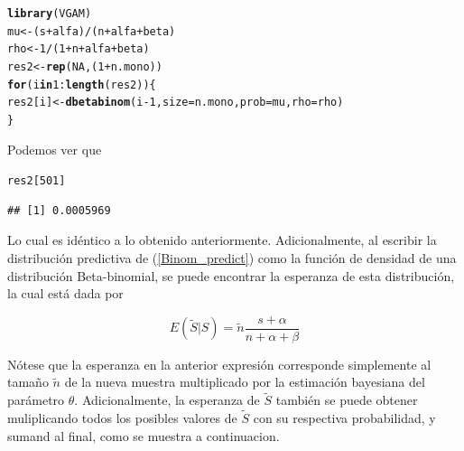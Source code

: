 \documentclass[10pt,openright]{book}\usepackage[]{graphicx}\usepackage[]{color}
\makeatletter
\newcommand{\hlnum}[1]{\textcolor[rgb]{0.686,0.059,0.569}{#1}}%
\newcommand{\hlopt}[1]{\textcolor[rgb]{0,0,0}{#1}}%
\newcommand{\hlstd}[1]{\textcolor[rgb]{0.345,0.345,0.345}{#1}}%
\newcommand{\hlkwa}[1]{\textcolor[rgb]{0.161,0.373,0.58}{\textbf{#1}}}%
\newcommand{\hlkwb}[1]{\textcolor[rgb]{0.69,0.353,0.396}{#1}}%
\newcommand{\hlkwc}[1]{\textcolor[rgb]{0.333,0.667,0.333}{#1}}%
\newcommand{\hlkwd}[1]{\textcolor[rgb]{0.737,0.353,0.396}{\textbf{#1}}}%
\newenvironment{kframe}{%
 \def\at@end@of@kframe{}%
 \ifinner\ifhmode%
  \def\at@end@of@kframe{\end{minipage}}%
  \begin{minipage}{\columnwidth}%
 \fi\fi%
 \def\FrameCommand##1{\hskip\@totalleftmargin \hskip-\fboxsep
 \colorbox{shadecolor}{##1}\hskip-\fboxsep
     \hskip-\linewidth \hskip-\@totalleftmargin \hskip\columnwidth}%
 \MakeFramed {\advance\hsize-\width
   \@totalleftmargin\z@ \linewidth\hsize
   \@setminipage}}%
 {\par\unskip\endMakeFramed%
 \at@end@of@kframe}
\newenvironment{knitrout}{}{} %
\makeatother
\begin{document}
\begin{knitrout}
\color{fgcolor}\begin{kframe}
\begin{alltt}
\hlkwd{library}\hlstd{(VGAM)}
\hlstd{mu}\hlkwb{<-}\hlstd{(s}\hlopt{+}\hlstd{alfa)}\hlopt{/}\hlstd{(n}\hlopt{+}\hlstd{alfa}\hlopt{+}\hlstd{beta)}
\hlstd{rho}\hlkwb{<-}\hlnum{1}\hlopt{/}\hlstd{(}\hlnum{1}\hlopt{+}\hlstd{n}\hlopt{+}\hlstd{alfa}\hlopt{+}\hlstd{beta)}
\hlstd{res2}\hlkwb{<-}\hlkwd{rep}\hlstd{(}\hlnum{NA}\hlstd{,(}\hlnum{1}\hlopt{+}\hlstd{n.mono))}
\hlkwa{for}\hlstd{(i} \hlkwa{in} \hlnum{1}\hlopt{:}\hlkwd{length}\hlstd{(res2))\{}
  \hlstd{res2[i]}\hlkwb{<-}\hlkwd{dbetabinom}\hlstd{(i}\hlopt{-}\hlnum{1}\hlstd{,}\hlkwc{size}\hlstd{=n.mono,}\hlkwc{prob}\hlstd{=mu,}\hlkwc{rho}\hlstd{=rho)}
\hlstd{\}}
\end{alltt}
\end{kframe}
\end{knitrout}
    
    Podemos ver que
\begin{knitrout}
\color{fgcolor}\begin{kframe}
\begin{alltt}
\hlstd{res2[}\hlnum{501}\hlstd{]}
\end{alltt}
\begin{verbatim}
## [1] 0.0005969
\end{verbatim}
\end{kframe}
\end{knitrout}
    Lo cual es id\'entico a lo obtenido anteriormente. Adicionalmente, al escribir la distribuci\'on predictiva de (\ref{Binom_predict}) como la funci\'on de densidad de una distribuci\'on Beta-binomial, se puede encontrar la esperanza de esta distribuci\'on, la cual est\'a dada por
    
    \begin{equation*}
    E(\tilde{S}|S)=\tilde{n}\frac{s+\alpha}{n+\alpha+\beta}
    \end{equation*}
    
    N\'otese que la esperanza en la anterior expresi\'on corresponde simplemente al tama\~no $\tilde{n}$ de la nueva muestra multiplicado por la estimaci\'on bayesiana del par\'ametro $\theta$. Adicionalmente, la esperanza de $\tilde{S}$ tambi\'en se puede obtener muliplicando todos los posibles valores de $\tilde{S}$ con su respectiva probabilidad, y sumand al final, como se muestra a continuacion.
    
\end{document}
